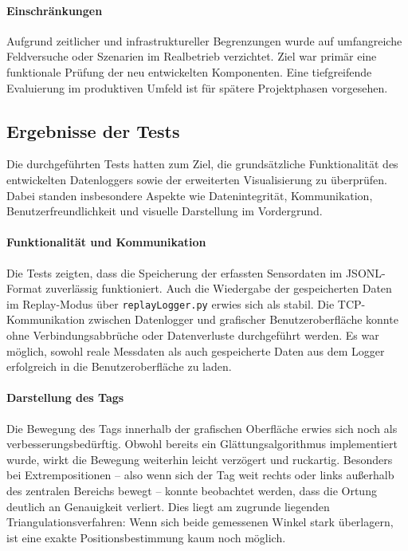 \documentclass[a4paper, 12pt]{article} %
\begin{document}
\paragraph{Einschränkungen}
Aufgrund zeitlicher und infrastruktureller Begrenzungen wurde auf umfangreiche Feldversuche oder Szenarien im Realbetrieb verzichtet. Ziel 
war primär eine funktionale Prüfung der neu entwickelten Komponenten. Eine tiefgreifende Evaluierung im produktiven Umfeld ist für spätere 
Projektphasen vorgesehen.



\subsection{Ergebnisse der Tests}

Die durchgeführten Tests hatten zum Ziel, die grundsätzliche Funktionalität des entwickelten Datenloggers sowie der erweiterten Visualisierung zu 
überprüfen. Dabei standen insbesondere Aspekte wie Datenintegrität, Kommunikation, Benutzerfreundlichkeit und visuelle Darstellung im Vordergrund.

\paragraph{Funktionalität und Kommunikation}
Die Tests zeigten, dass die Speicherung der erfassten Sensordaten im JSONL-Format zuverlässig funktioniert. Auch die Wiedergabe der gespeicherten Daten 
im Replay-Modus über \texttt{replayLogger.py} erwies sich als stabil. Die TCP-Kommunikation zwischen Datenlogger und grafischer Benutzeroberfläche konnte 
ohne Verbindungsabbrüche oder Datenverluste durchgeführt werden. Es war möglich, sowohl reale Messdaten als auch gespeicherte Daten aus dem Logger 
erfolgreich in die Benutzeroberfläche zu laden.

\paragraph{Darstellung des Tags}
Die Bewegung des Tags innerhalb der grafischen Oberfläche erwies sich noch als verbesserungsbedürftig. Obwohl bereits ein Glättungsalgorithmus 
implementiert wurde, wirkt die Bewegung weiterhin leicht verzögert und ruckartig. Besonders bei Extrempositionen – also wenn sich der Tag weit 
rechts oder links außerhalb des zentralen Bereichs bewegt – konnte beobachtet werden, dass die Ortung deutlich an Genauigkeit verliert. Dies liegt
 am zugrunde liegenden Triangulationsverfahren: Wenn sich beide gemessenen Winkel stark überlagern, ist eine exakte Positionsbestimmung kaum noch 
 möglich.
\end{document}
